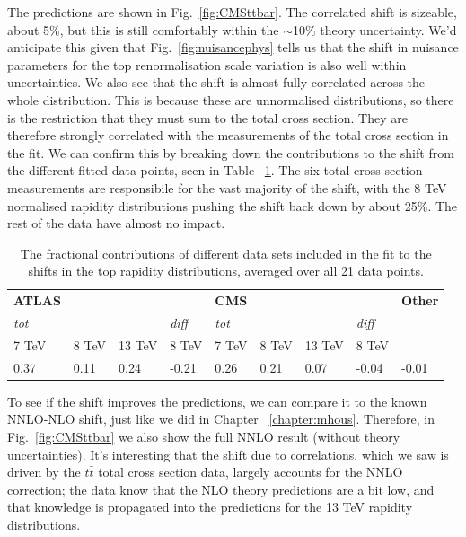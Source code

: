 The predictions are shown in Fig.~\ref{fig:CMSttbar}. The correlated shift is sizeable, about 5\%, but this is still comfortably within the $\sim$10\% theory uncertainty. We'd anticipate this given that Fig.~\ref{fig:nuisancephys} tells us that the shift in nuisance parameters for the top renormalisation scale variation is also well within uncertainties. We also see that the shift is almost fully correlated across the whole distribution. This is because these are unnormalised distributions, so there is the restriction that they must sum to the total cross section. They are therefore strongly correlated with the measurements of the total cross section in the fit. We can confirm this by breaking down the contributions to the shift from the different fitted data points, seen in Table ~\ref{tab:deltilcons}. The six total cross section measurements are responsibile for the vast majority of the shift, with the 8 TeV normalised rapidity distributions pushing the shift back down by about 25\%. The rest of the data have almost no impact.
\begin{table}[h]
  \centering
  \scriptsize
  \renewcommand{\arraystretch}{1.4}
  \begin{tabular}{|llll|llll|l|}
   \hline
 {\bf ATLAS} &&&& {\bf CMS} &&&& {\bf Other}\\
 {\it tot} &&&{\it diff} &{\it tot}&&&{\it diff} & \\
  7 TeV &  8 TeV & 13 TeV & 8 TeV &7 TeV & 8 TeV &13 TeV & 8 TeV & \\
    \hline
 0.37 & 0.11 & 0.24 & -0.21 & 0.26 & 0.21 & 0.07 & -0.04 & -0.01 \\
\hline
  \end{tabular}
\caption{The fractional contributions of different data sets included in the fit to the
shifts in the top rapidity distributions, averaged over all 21 data points.}
\label{tab:deltilcons}
\end{table}

To see if the shift improves the predictions, we can compare it to the known NNLO-NLO shift, just like we did in Chapter ~\ref{chapter:mhous}. Therefore, in Fig.~\ref{fig:CMSttbar} we also show the full NNLO result (without theory uncertainties). It's interesting that the shift due to correlations, which we saw is driven by the $t\bar{t}$ total cross section data, largely accounts for the NNLO correction; the data know that the NLO theory predictions are a bit low, and that knowledge is propagated into the predictions for the 13 TeV rapidity distributions. 

